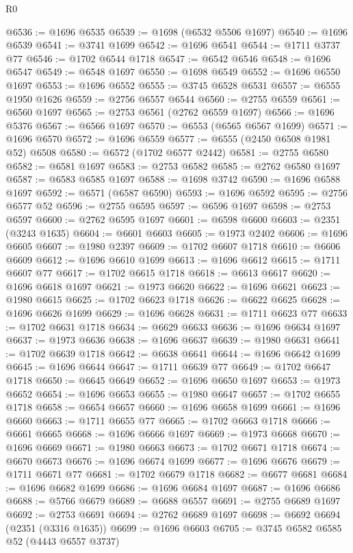 \begin{lexlean}{R0}
\begin{coremodule}
@6536 := @1696 @6535
@6539 := @1698 (@6532 @5506 @1697)
@6540 := @1696 @6539
@6541 := @3741 @1699
@6542 := @1696 @6541
@6544 := @1711 @3737 @77
@6546 := @1702 @6544 @1718
@6547 := @6542 @6546
@6548 := @1696 @6547
@6549 := @6548 @1697
@6550 := @1698 @6549
@6552 := @1696 @6550 @1697
@6553 := @1696 @6552
@6555 := @3745 @6528 @6531
@6557 := @6555 @1950 @1626
@6559 := @2756 @6557 @6544
@6560 := @2755 @6559
@6561 := @6560 @1697
@6565 := @2753 @6561 (@2762 @6559 @1697)
@6566 := @1696 @5376
@6567 := @6566 @1697
@6570 := @6553 (@6565 @6567 @1699)
@6571 := @1696 @6570
@6572 := @1696 @6559
@6577 := @6555 (@2450 @6508 @1981 @52) @6508
@6580 := @6572 (@1702 @6577 @2442)
@6581 := @2755 @6580
@6582 := @6581 @1697
@6583 := @2753 @6582
@6585 := @2762 @6580 @1697
@6587 := @6583 @6585 @1697
@6588 := @1698 @3742
@6590 := @1696 @6588 @1697
@6592 := @6571 (@6587 @6590)
@6593 := @1696 @6592
@6595 := @2756 @6577 @52
@6596 := @2755 @6595
@6597 := @6596 @1697
@6598 := @2753 @6597
@6600 := @2762 @6595 @1697
@6601 := @6598 @6600
@6603 := @2351 (@3243 @1635)
@6604 := @6601 @6603
@6605 := @1973 @2402
@6606 := @1696 @6605
@6607 := @1980 @2397
@6609 := @1702 @6607 @1718
@6610 := @6606 @6609
@6612 := @1696 @6610 @1699
@6613 := @1696 @6612
@6615 := @1711 @6607 @77
@6617 := @1702 @6615 @1718
@6618 := @6613 @6617
@6620 := @1696 @6618 @1697
@6621 := @1973 @6620
@6622 := @1696 @6621
@6623 := @1980 @6615
@6625 := @1702 @6623 @1718
@6626 := @6622 @6625
@6628 := @1696 @6626 @1699
@6629 := @1696 @6628
@6631 := @1711 @6623 @77
@6633 := @1702 @6631 @1718
@6634 := @6629 @6633
@6636 := @1696 @6634 @1697
@6637 := @1973 @6636
@6638 := @1696 @6637
@6639 := @1980 @6631
@6641 := @1702 @6639 @1718
@6642 := @6638 @6641
@6644 := @1696 @6642 @1699
@6645 := @1696 @6644
@6647 := @1711 @6639 @77
@6649 := @1702 @6647 @1718
@6650 := @6645 @6649
@6652 := @1696 @6650 @1697
@6653 := @1973 @6652
@6654 := @1696 @6653
@6655 := @1980 @6647
@6657 := @1702 @6655 @1718
@6658 := @6654 @6657
@6660 := @1696 @6658 @1699
@6661 := @1696 @6660
@6663 := @1711 @6655 @77
@6665 := @1702 @6663 @1718
@6666 := @6661 @6665
@6668 := @1696 @6666 @1697
@6669 := @1973 @6668
@6670 := @1696 @6669
@6671 := @1980 @6663
@6673 := @1702 @6671 @1718
@6674 := @6670 @6673
@6676 := @1696 @6674 @1699
@6677 := @1696 @6676
@6679 := @1711 @6671 @77
@6681 := @1702 @6679 @1718
@6682 := @6677 @6681
@6684 := @1696 @6682 @1699
@6686 := @1696 @6684 @1697
@6687 := @1696 @6686
@6688 := @5766 @6679
@6689 := @6688 @6557
@6691 := @2755 @6689 @1697
@6692 := @2753 @6691
@6694 := @2762 @6689 @1697
@6698 := @6692 @6694 (@2351 (@3316 @1635))
@6699 := @1696 @6603
@6705 := @3745 @6582 @6585 @52 (@4443 @6557 @3737)

\end{coremodule}
\end{lexlean}
